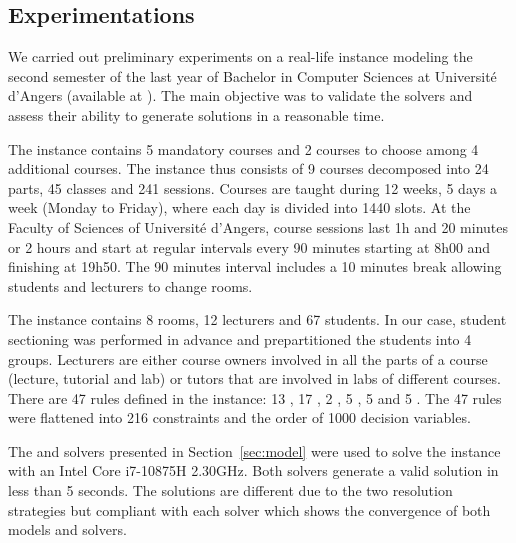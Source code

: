 \subsection{Experimentations}
\label{sec:experimentations}

% 
% 
We carried out preliminary experiments on a real-life instance modeling the second semester of the last year of Bachelor in Computer Sciences at Université d'Angers (available at \cite{uspSite}).
The main objective was to validate the solvers and assess their ability to generate solutions in a reasonable time. 

The instance contains 5 mandatory courses and 2 courses to choose among 4 additional courses.
The instance thus consists of 9 courses decomposed into 24 parts, 45 classes and 241 sessions.
Courses are taught during 12 weeks, 5 days a week (Monday to Friday), where each day is divided into 1440 slots.
At the Faculty of Sciences of Université d'Angers, course sessions last 1h and 20 minutes or 2 hours and start at regular intervals every 90 minutes starting at 8h00 and finishing at 19h50.
The 90 minutes interval includes a 10 minutes break
allowing students and lecturers to change rooms.

The instance contains 8 rooms, 12 lecturers and 67 students. %
In our case, student sectioning was performed in advance and prepartitioned the students into 4 groups.
Lecturers are either course owners involved in all the parts of a course (lecture, tutorial and lab) or tutors that are involved in labs of different courses.
There are 47 rules defined in the instance: 13 \texttt{\WEEKLY{}}, 17 \texttt{\SEQUENCED{}}, 2 \texttt{\SAMESLOT{}}, 5 \texttt{\SAMEWEEK{}}, 5 \texttt{\SAMEROOMS{}} and 5 \texttt{\SAMETEACHERS{}}.
The 47 rules were flattened into 216 constraints and the order of 1000 decision variables.


The \MINIZINC{} and \CHR{} solvers presented in Section~\ref{sec:model} were used to solve the instance with an Intel Core i7-10875H 2.30GHz.
Both solvers generate a valid solution in less than 5 seconds.
The solutions are different due to the two resolution strategies but compliant with 
each solver %
which shows the convergence of both models and solvers.
